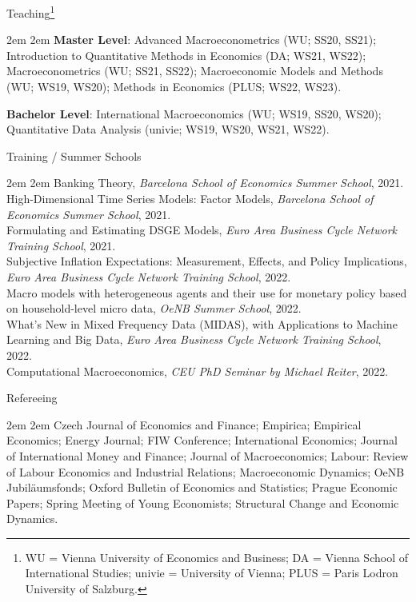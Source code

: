 \documentclass{resume} %
\begin{document}
\vspace{0.2cm}
{\large Teaching\footnote{WU = Vienna University of Economics and Business; DA = Vienna School of International Studies; univie = University of Vienna; PLUS = Paris Lodron University of Salzburg.}}
\par \begingroup \leftskip2em \rightskip2em \vspace{-0.2cm}
    \textbf{Master Level}: Advanced Macroeconometrics (WU; SS20, SS21); Introduction to Quantitative Methods in Economics (DA; WS21, WS22); Macroeconometrics (WU; SS21, SS22); Macroeconomic Models and Methods (WU; WS19, WS20); Methods in Economics (PLUS; WS22, WS23).

    \textbf{Bachelor Level}: International Macroeconomics (WU; WS19, SS20, WS20); Quantitative Data Analysis (univie; WS19, WS20, WS21, WS22).
\par \endgroup

\vspace{0.2cm}
{\large Training / Summer Schools}
\par \begingroup \leftskip2em \rightskip2em \vspace{-0.2cm}
    Banking Theory, \textit{Barcelona School of Economics Summer School}, 2021. \\
    High-Dimensional Time Series Models: Factor Models, \textit{Barcelona School of Economics Summer School}, 2021. \\
    Formulating and Estimating DSGE Models, \textit{Euro Area Business Cycle Network Training School}, 2021. \\
    Subjective Inflation Expectations: Measurement, Effects, and Policy Implications, \textit{Euro Area Business Cycle Network Training School}, 2022. \\
    Macro models with heterogeneous agents and their use for monetary policy based on household-level micro data, \textit{OeNB Summer School}, 2022. \\
    What's New in Mixed Frequency Data (MIDAS), with Applications to Machine Learning and Big Data, \textit{Euro Area Business Cycle Network Training School}, 2022. \\
    Computational Macroeconomics, \textit{CEU PhD Seminar by Michael Reiter}, 2022.
\par \endgroup

\vspace{0.2cm}
{\large Refereeing}
\par \begingroup \leftskip2em \rightskip2em \vspace{-0.2cm}
    Czech Journal of Economics and Finance; Empirica; Empirical Economics; Energy Journal; FIW Conference; International Economics; Journal of International Money and Finance; Journal of Macroeconomics; Labour: Review of Labour Economics and Industrial Relations; Macroeconomic Dynamics; OeNB Jubil\"aumsfonds; Oxford Bulletin of Economics and Statistics; Prague Economic Papers; Spring Meeting of Young Economists; Structural Change and Economic Dynamics.
\par \endgroup
\end{document}
